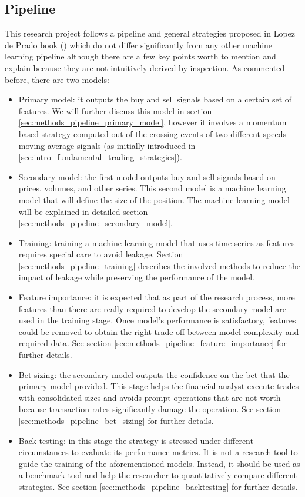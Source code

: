 \subsection{Pipeline}
\label{sec:methods_pipeline}

This research project follows a pipeline and general strategies proposed in
Lopez de Prado book (\cite{lopez_de_prado}) which do not differ significantly
from any other machine learning pipeline although there are a few key points
worth to mention and explain because they are not intuitively derived by
inspection. As commented before, there are two models:

\begin{itemize}
  \item Primary model: it outputs the buy and sell signals based on a certain
        set of features. We will further discuss this model in section \ref{sec:methods_pipeline_primary_model},
        however it involves a momentum based strategy computed out of the
        crossing events of two different speeds moving average signals (as
        initially introduced in \ref{sec:intro_fundamental_trading_strategies}).
  \item Secondary model: the first model outputs buy and sell signals based on
        prices, volumes, and other series. This second model is a machine
        learning model that will define the size of the position. The machine
        learning model will be explained in detailed section \ref{sec:methods_pipeline_secondary_model}.
  \item Training: training a machine learning model that uses time series as
        features requires special care to avoid leakage. Section \ref{sec:methods_pipeline_training}
        describes the involved methods to reduce the impact of leakage while
        preserving the performance of the model.
  \item Feature importance: it is expected that as part of the research process,
        more features than there are really required to develop the secondary
        model are used in the training stage. Once model's performance is satisfactory, features
        could be removed to obtain the right trade off between model complexity
        and required data. See section \ref{sec:methods_pipeline_feature_importance}
        for further details.
  \item Bet sizing: the secondary model outputs the confidence on the bet that 
        the primary model provided. This stage helps the financial analyst
        execute trades with consolidated sizes and avoids prompt operations that
        are not worth because transaction rates significantly damage the
        operation. See section \ref{sec:methods_pipeline_bet_sizing} for further
        details.
  \item Back testing: in this stage the strategy is stressed under different
        circumstances to evaluate its performance metrics. It is not a research
        tool to guide the training of the aforementioned models. Instead, it
        should be used as a benchmark tool and help the researcher to
        quantitatively compare different strategies. See section \ref{sec:methods_pipeline_backtesting}
        for further details.
\end{itemize}


